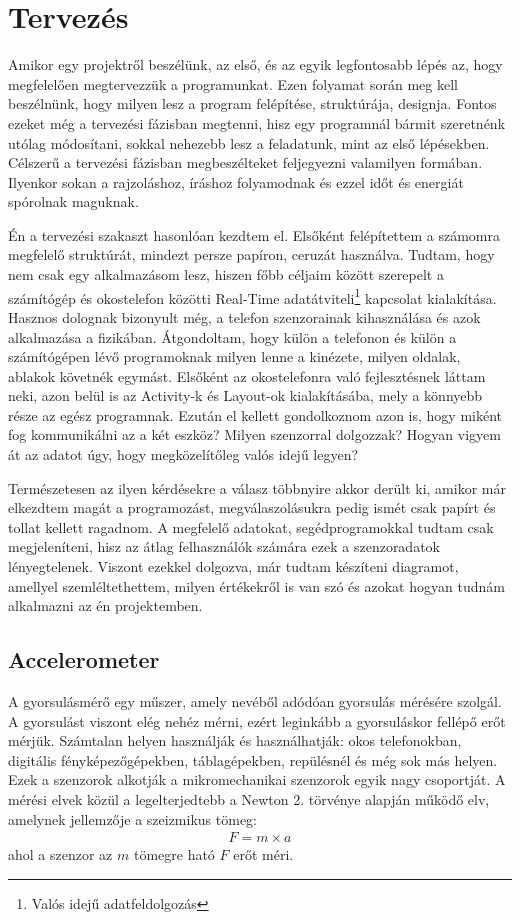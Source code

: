 \documentclass{thesis-ekf}
\theoremstyle{definition}
\theoremstyle{remark}
\begin{document}
\chapter{Tervezés}
	Amikor egy projektről beszélünk, az első, és az egyik legfontosabb lépés az, hogy megfelelően megtervezzük a programunkat. Ezen folyamat során meg kell beszélnünk, hogy milyen lesz a program felépítése, struktúrája, designja. Fontos ezeket még a tervezési fázisban megtenni, hisz egy programnál bármit szeretnénk utólag módosítani, sokkal nehezebb lesz a feladatunk, mint az első lépésekben. Célszerű a tervezési fázisban megbeszélteket feljegyezni valamilyen formában. Ilyenkor sokan a rajzoláshoz, íráshoz folyamodnak és ezzel időt és energiát spórolnak maguknak.
	\par Én a tervezési szakaszt hasonlóan kezdtem el. Elsőként felépítettem a számomra megfelelő struktúrát, mindezt persze papíron, ceruzát használva. Tudtam, hogy nem csak egy alkalmazásom lesz, hiszen főbb céljaim között szerepelt a számítógép és okostelefon közötti Real-Time adatátviteli\footnote{Valós idejű adatfeldolgozás} kapcsolat kialakítása. Hasznos dolognak bizonyult még, a telefon szenzorainak kihasználása és azok alkalmazása a fizikában. Átgondoltam, hogy külön a telefonon és külön a számítógépen lévő programoknak milyen lenne a kinézete, milyen oldalak, ablakok követnék egymást. Elsőként az okostelefonra való fejlesztésnek láttam neki, azon belül is az Activity-k és Layout-ok kialakításába, mely a könnyebb része az egész programnak. Ezután el kellett gondolkoznom azon is, hogy miként fog kommunikálni az a két eszköz? Milyen szenzorral dolgozzak? Hogyan vigyem át az adatot úgy, hogy megközelítőleg valós idejű legyen?
	\par Természetesen az ilyen kérdésekre a válasz többnyire akkor derült ki, amikor már elkezdtem magát a programozást, megválaszolásukra pedig ismét csak papírt és tollat kellett ragadnom. A megfelelő adatokat, segédprogramokkal tudtam csak megjeleníteni, hisz az átlag felhasználók számára ezek a szenzoradatok lényegtelenek. Viszont ezekkel dolgozva, már tudtam készíteni diagramot, amellyel szemléltethettem, milyen értékekről is van szó és azokat hogyan tudnám alkalmazni az én projektemben.
\section{Accelerometer}
A gyorsulásmérő egy műszer, amely nevéből adódóan gyorsulás mérésére szolgál. A gyorsulást viszont elég nehéz mérni, ezért leginkább a gyorsuláskor fellépő erőt mérjük. Számtalan helyen használják és használhatják: okos telefonokban, digitális fényképezőgépekben, táblagépekben, repülésnél és még sok más helyen. Ezek a szenzorok alkotják a mikromechanikai szenzorok egyik nagy csoportját. A mérési elvek közül a legelterjedtebb a Newton 2. törvénye alapján működő elv, amelynek jellemzője a szeizmikus tömeg:
\begin{align*}
F=m\times a
\end{align*}
ahol a szenzor az $m$ tömegre ható $F$ erőt méri.
\end{document}
